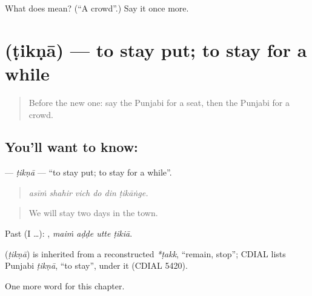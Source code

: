 \begin{tcolorbox}[breakable,colback=teal!4,colframe=teal!35!black,title={Before you move on}]
What does  mean? (\textquotedblleft{}A crowd\textquotedblright{}.) Say it once more.
\end{tcolorbox}
\section[\texorpdfstring{\pa{ਟਿਕਣਾ} (ṭikṇā)}{ਟਿਕਣਾ (ṭikṇā)}]{ (ṭikṇā) — to stay put; to stay for a while}

\label{lesson:PA-C268-tikna}



\begin{quote}
Before the new one: say the Punjabi for a seat, then the Punjabi for a crowd.
\end{quote}

\subsection*{You'll want to know: }
\textbf{} — \emph{ṭikṇā} — \textquotedblleft{}to stay put; to stay for a while\textquotedblright{}.

\begin{quote}
     
\end{quote}

\begin{quote}
\emph{asīṁ shahir vich do din ṭikāṅge.}
\end{quote}

\begin{quote}
We will stay two days in the town.
\end{quote}

Past (I …):    , \emph{maiṁ aḍḍe utte ṭikiā}.

\begin{cousinweb}
\textbf{} (\emph{ṭikṇā}) is inherited from a reconstructed \emph{*ṭakk}, \textquotedblleft{}remain, stop\textquotedblright{}; CDIAL lists Punjabi \emph{ṭikṇā}, \textquotedblleft{}to stay\textquotedblright{}, under it (CDIAL 5420).
\end{cousinweb}

\begin{grammarlens}[title={What you've built}]
One more word for this chapter.
\end{grammarlens}

